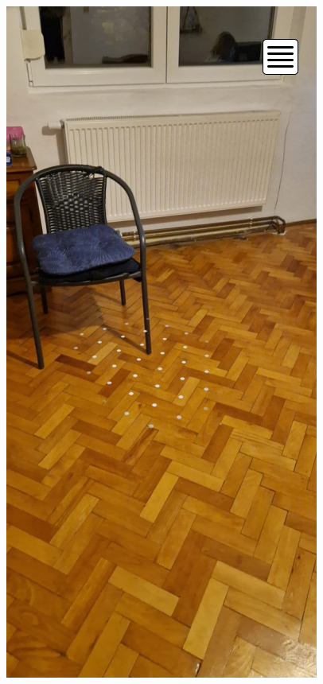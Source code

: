 \begin{center}
    \includegraphics[scale=0.5]{img/App_mock/iPhone 14 - 8.png}
\end{center}
\pagebreak

